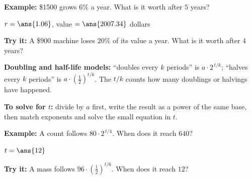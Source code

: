 \documentclass[12pt]{article}
\begin{document}
\begin{examplebox}
\textbf{Example:} \quad \$1500 grows $6\%$ a year. What is it worth after $5$ years?

$r = \ans{1.06}$, \quad value $= \ans{2007.34}$ dollars
\end{examplebox}

\begin{tryitbox}
\textbf{Try it:} \quad A \$900 machine loses $20\%$ of its value a year. What is it worth after $4$ years?\\[2pt]
\end{tryitbox}


\begin{formulabox}
\textbf{Doubling and half-life models:} ``doubles every $k$ periods'' is $a \cdot 2^{\,t/k}$; ``halves every $k$ periods'' is $a \cdot \left(\frac{1}{2}\right)^{t/k}$. The $t/k$ counts how many doublings or halvings have happened.\par
\textbf{To solve for $t$:} divide by $a$ first, write the result as a power of the same base, then match exponents and solve the small equation in $t$.
\end{formulabox}

\begin{examplebox}
\textbf{Example:} \quad A count follows $80 \cdot 2^{\,t/4}$. When does it reach $640$?

$t = \ans{12}$
\end{examplebox}

\begin{tryitbox}
\textbf{Try it:} \quad A mass follows $96 \cdot \left(\frac{1}{2}\right)^{t/6}$. When does it reach $12$?\\[2pt]
\end{tryitbox}
\end{document}
